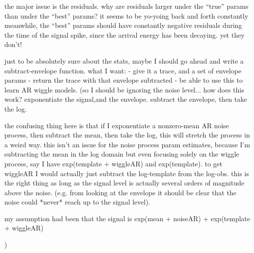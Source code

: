 \documentclass{article}
\begin{document}
the major issue is the residuals. why are residuals larger under the ``true'' params than under the ``best'' params? it seems to be yo-yoing back and forth constantly
meanwhile, the ``best'' params should have constantly negative residuals during the time of the signal spike, since the arrival energy has been decaying. 
yet they don't! 



just to be absolutely sure about the stats, maybe I should go ahead and write a subtract-envelope function. what I want:
- give it a trace, and a set of envelope params
- return the trace with that envelope subtracted
- be able to use this to learn AR wiggle models. (so I should be ignoring the noise level... how does this work? exponentiate the signal,and the envelope. subtract the envelope, then take the log. 

the confusing thing here is that if I exponentiate a nonzero-mean AR noise process, then subtract the mean, then take the log, this will stretch the process in a weird way. 
this isn't an issue for the noise process param estimates, because I'm subtracting the mean in the log domain
but even focusing solely on the wiggle process, say I have exp(template + wiggleAR) and exp(template). to get wiggleAR I would actually just subtract the log-template from the log-obs. this is the right thing as long as the signal level is actually several orders of magnitude above the noise. (e.g. from looking at the envelope it should be clear that the noise could *never* reach up to the signal level). 


my assumption had been that the signal is exp(mean + noiseAR) + exp(template + wiggleAR) 



) 
\end{document}
